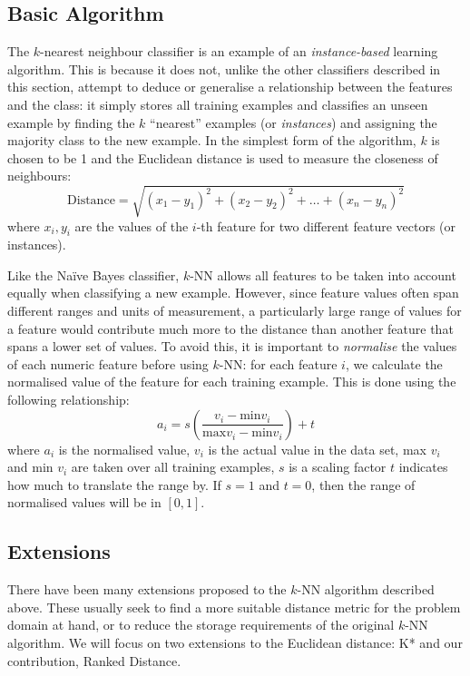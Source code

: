 \subsection{Basic Algorithm}
The $k$-nearest neighbour classifier is an example of an
\textit{instance-based} learning algorithm. This is because it does not, unlike
the other classifiers described in this section, attempt to deduce or
generalise a relationship between the features and the class: it simply stores
all training examples and classifies an unseen example by finding the $k$
``nearest'' examples (or \textit{instances}) and assigning the majority class
to the new example. In the simplest form of the algorithm, $k$ is chosen to be
1 and the Euclidean distance is used to measure the closeness of neighbours:
\begin{equation*}
\mathrm{Distance} = \sqrt{(x_1-y_1)^2 + (x_2-y_2)^2 + \ldots + (x_n-y_n)^2}
\end{equation*}
where $x_i,y_i$ are the values of the $i$-th feature for two different feature
vectors (or instances).

Like the Na\"{i}ve Bayes classifier, $k$-NN allows all features to be taken
into account equally when classifying a new example. However, since feature
values often span different ranges and units of measurement, a particularly
large range of values for a feature would contribute much more to the distance
than another feature that spans a lower set of values.
To avoid this, it is important to \textit{normalise} the
values of each numeric feature before using $k$-NN: for each feature $i$, we
calculate the normalised value of the feature for each training example. This
is done using the following relationship:
\begin{equation*}
a_i = s\left(\dfrac{v_i - \mathrm{min }v_i}{\mathrm{max }v_i - \mathrm{min }v_i}\right) + t
\end{equation*}
where $a_i$ is the normalised value, $v_i$ is the actual value in the data
set, max $v_i$ and min $v_i$ are taken over all training examples, $s$ is a
scaling factor $t$ indicates how much to translate the range by. If $s=1$
and $t=0$, then the range of normalised values will be in $[0,1]$.

\subsection{Extensions}
There have been many extensions proposed to the $k$-NN algorithm described
above. These usually seek to find a more suitable distance metric for the
problem domain at hand, or to reduce the storage requirements of the original
$k$-NN algorithm. We will focus on two extensions to the Euclidean distance:
K* and our contribution, Ranked Distance.

